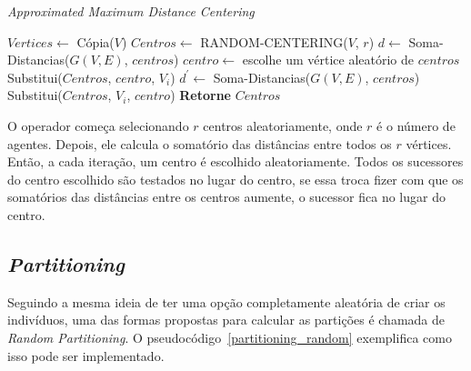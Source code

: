 \begin{algorithm}                  %
	\caption{\textit{Approximated Maximum Distance Centering}}          %
	\label{centering_maximum}                           %
	\begin{algorithmic}                    %
		\newline
		\State $Vertices \gets $ Cópia($V$)
		\State $Centros \gets $ RANDOM-CENTERING($V$, $r$)
		\State $d \gets $ Soma-Distancias($G(V,E)$, $centros$) 
		\Repeat
			\State $centro \gets $ escolhe um vértice aleatório de $centros$
				\State Substitui($Centros$, $centro$, $V_{i}$) 
				\State $d^{\prime} \gets $ Soma-Distancias($G(V,E)$, $centros$)
					\State Substitui($Centros$, $V_{i}$, $centro$)
				\EndIf
			\EndFor
		\State \textbf{Retorne} $Centros$
		\EndProcedure
	\end{algorithmic}
\end{algorithm}

O operador começa selecionando $r$ centros aleatoriamente, onde $r$ é o número 
de agentes. Depois, ele calcula o somatório das distâncias entre todos os $r$ 
vértices. Então, a cada iteração, um centro é escolhido aleatoriamente. Todos 
os sucessores do centro escolhido são testados no lugar do centro, se essa troca 
fizer com que os somatórios das distâncias entre os centros aumente, o sucessor 
fica no lugar do centro.

\subsection{\textit{Partitioning}}

Seguindo a mesma ideia de ter uma opção completamente aleatória de criar os 
indivíduos, uma das formas propostas para calcular as partições é chamada de 
\textit{Random Partitioning}. O pseudocódigo~\ref{partitioning_random} 
exemplifica como isso pode ser implementado.

